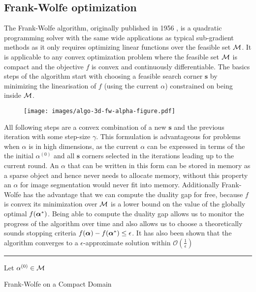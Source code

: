 \subsection{Frank-Wolfe optimization}
The Frank-Wolfe algorithm, originally published in 1956 \cite{frank1956algorithm}, is a quadratic programming solver with the same wide applications as typical sub-gradient methods as it only requires optimizing linear functions over the feasible set $\mathcal{M}$. It is applicable to any convex optimization problem where the feasible set $\mathcal{M}$ is compact and the objective $f$ is convex and continuously differentiable. The basics steps of the algorithm start with choosing a feasible search corner $\bm{s}$ by minimizing the linearisation of $f$ (using the current $\alpha$) constrained on being inside  $\mathcal{M}$. 
\begin{figure}[H]
  \centering
 \texttt{[image: images/algo-3d-fw-alpha-figure.pdf]}
  \caption{ } 
  \label{fig:frankwolfe}
\end{figure} 
All following steps are a convex combination of a new $\bm{s}$ and the previous iteration with some step-size $\gamma$.  This formulation is advantageous for problems when $\alpha$ is in high dimensions, as the current $\alpha$ can be expressed in terms of the the initial $\alpha^{(0)}$ and all  $\bm{s}$ corners selected in the iterations leading up to the current round. An $\alpha$ that can be written in this form can be stored in memory as a sparse object and hence never needs to allocate memory, without this property an $\alpha$ for image segmentation would never fit into memory. Additionally Frank-Wolfe has the advantage that we can compute the duality gap for free, because $f$ is convex its minimization over $\mathcal{M}$ is a lower bound on the value of the globally optimal $f(\bm{\alpha}^*)$. Being able to compute the duality gap allows us to monitor the progress of the algorithm over time and also allows us to choose a theoretically sounds stopping criteria $f(\bm{\alpha}) - f(\bm{\alpha}^*) \leq \epsilon$. It has also been shown \cite{dunn1978conditional} that the algorithm converges to a $\epsilon$-approximate solution within $\mathcal{O}(\frac{1}{\epsilon})$

\begin{samepage}
  \rule{\textwidth}{2pt}
\begin{algorithm}[H]\label{algo:bcfw}
     Let $\alpha^{(0)} \in \mathcal{M}$\;
     \caption{ Frank-Wolfe on a Compact Domain  }
  \end{algorithm}
\hrulefill
\end{samepage}

